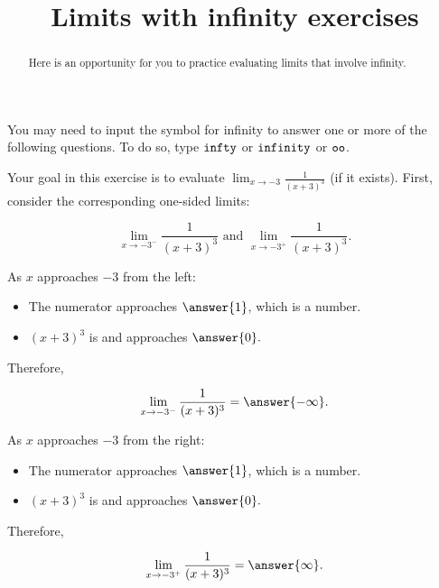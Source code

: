 \documentclass[handout]{ximera}
\title{Limits with infinity exercises}
\begin{document}
\begin{abstract}
Here is an opportunity for you to practice evaluating limits that involve infinity.  
\end{abstract}
\maketitle

You may need to input the symbol for infinity to answer one or more of the following questions.  To do so, type $\verb|infty|$ or $\verb|infinity|$ or $\verb|oo|$. 

\begin{exercise}
Your goal in this exercise is to evaluate $\displaystyle\lim_{x \to -3} \frac{1}{(x+3)^3}$ (if it exists).  First, consider the corresponding one-sided limits:

$$\lim_{x \to -3^-} \frac{1}{(x+3)^3} \text{ and } \lim_{x \to -3^+} \frac{1}{(x+3)^3}.$$

As $x$ approaches $-3$ from the left:  

\begin{itemize}

\item The numerator approaches $\answer{1}$, which is a  number. 

\item $(x+3)^3$ is  and approaches $\answer{0}.$ 

\end{itemize}

Therefore, 

 \[ \lim_{x \to -3^-} \frac{1}{(x+3)^3} = \answer{-\infty}.\]
 
As $x$ approaches $-3$ from the right: 

\begin{itemize}

\item The numerator approaches $\answer{1}$, which is a  number. 

\item $(x+3)^3$ is  and approaches $\answer{0}.$ 

\end{itemize}

Therefore, 

 \[ \lim_{x \to -3^+} \frac{1}{(x+3)^3} = \answer{\infty}. \]


\end{exercise}
\end{document}

